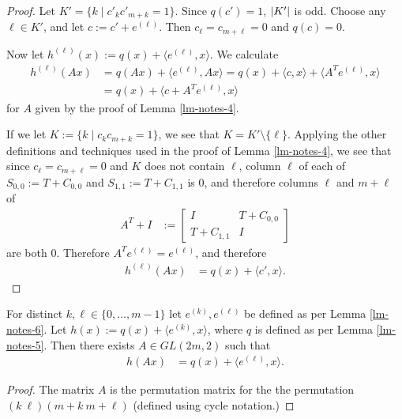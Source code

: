 \begin{proof}
Let $K'=\{k \mid c'_k c'_{m+k} = 1\}$. Since $q(c')=1$, $\left| K' \right|$ is odd.
Choose any $\ell \in K'$, and let $c := c' + e^{(\ell)}$.
Then $c_{\ell} = c_{m+\ell} = 0$ and $q(c)=0$.

Now let $h^{(\ell)}(x) := q(x) + \langle e^{(\ell)}, x \rangle$.
We calculate
\begin{align*}
h^{(\ell)}(A x)
&=
q(A x) + \langle e^{(\ell)}, A x \rangle
=
q(x) + \langle c, x \rangle + \langle A^T e^{(\ell)}, x \rangle
\\
&=
q(x) + \langle c + A^T e^{(\ell)}, x \rangle
\end{align*}
for $A$ given by the proof of Lemma \ref{lm-notes-4}.

If we let $K := \{ k \mid c_k c_{m+k} = 1 \}$, we see that $K = K' \setminus \{\ell\}$.
Applying the other definitions and techniques used in the proof of Lemma \ref{lm-notes-4},
we see that since $c_{\ell} = c_{m+\ell} = 0$ and $K$ does not contain $\ell$,
column $\ell$ of each of $S_{0,0} := T + C_{0,0}$
and $S_{1,1} := T + C_{1,1}$ is $0$, and therefore columns $\ell$ and $m + \ell$ of
\begin{align*}
A^T + I
&:=
\left[
\begin{array}{cc}
I & T + C_{0,0}
\\
T + C_{1,1} & I
\end{array}
\right]
\end{align*}
are both $0$.
Therefore $A^T e^{(\ell)} = e^{(\ell)}$, and therefore
\begin{align*}
h^{(\ell)}(A x)
&=
q(x) + \langle c', x \rangle.
\end{align*}

\end{proof}

\begin{Lemma}
\label{lm-notes-6-b}
For distinct $k,\ell \in \{0,\ldots,m-1\}$ let $e^{(k)}, e^{(\ell)}$ be defined as per Lemma
\ref{lm-notes-6}.
Let $h(x) := q(x) + \langle e^{(k)}, x \rangle$, where $q$ is defined as per Lemma \ref{lm-notes-5}.
Then there exists $A \in GL(2 m, 2)$ such that
\begin{align}
h(A x)
&=
q(x) + \langle e^{(\ell)},x \rangle.
\end{align}
\end{Lemma}

\begin{proof}
The matrix $A$ is the permutation matrix for the the permutation $(k\ \ell)(m+k\ m+\ell)$ (defined
using cycle notation.)
\end{proof}

